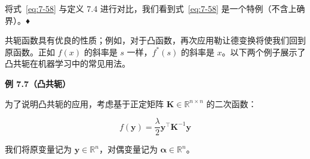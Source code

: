 将式~\eqref{eq:7-58} 与定义 7.4 进行对比，我们看到式~\eqref{eq:7-58} 是一个特例（不含上确界）。♦

共轭函数具有优良的性质；例如，对于凸函数，再次应用勒让德变换将使我们回到原函数。正如 $ f(x) $ 的斜率是 $ s $ 一样，$ f^*(s) $ 的斜率是 $ x $。以下两个例子展示了凸共轭在机器学习中的常见用法。

\begin{notebox}
\textbf{例 7.7（凸共轭）}
\end{notebox}

\begin{notebox}
为了说明凸共轭的应用，考虑基于正定矩阵 $ \boldsymbol{K} \in \mathbb{R}^{n \times n} $ 的二次函数：

\begin{equation}
f(\boldsymbol{y}) = \frac{\lambda}{2} \boldsymbol{y}^\top \boldsymbol{K}^{-1} \boldsymbol{y}
\tag{7.59}\label{eq:7-59}
\end{equation}

我们将原变量记为 $ \boldsymbol{y} \in \mathbb{R}^n $，对偶变量记为 $ \boldsymbol{\alpha} \in \mathbb{R}^n $。
\end{notebox}

